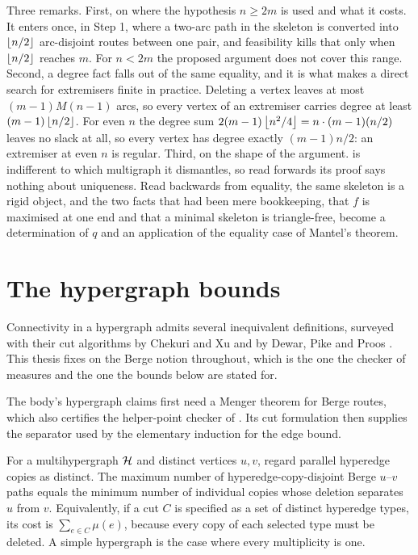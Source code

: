 Three remarks. First, on where the hypothesis $n \ge 2m$ is used and what it costs. It enters once, in Step 1, where a two-arc path in the skeleton is converted into $\left\lfloor n/2 \right\rfloor$ arc-disjoint routes between one pair, and feasibility kills that only when $\left\lfloor n/2 \right\rfloor$ reaches $m$. For $n < 2m$ the proposed argument does not cover this range. Second, a degree fact falls out of the same equality, and it is what makes a direct search for extremisers finite in practice. Deleting a vertex leaves at most $(m-1)M(n-1)$ arcs, so every vertex of an extremiser carries degree at least $(m-1)\left\lfloor n/2 \right\rfloor$. For even $n$ the degree sum $2(m-1)\left\lfloor n^2/4 \right\rfloor = n \cdot (m-1)(n/2)$ leaves no slack at all, so every vertex has degree exactly $(m-1)n/2$: an extremiser at even $n$ is regular. Third, on the shape of the argument.  is indifferent to which multigraph it dismantles, so read forwards its proof says nothing about uniqueness. Read backwards from equality, the same skeleton is a rigid object, and the two facts that had been mere bookkeeping, that $f$ is maximised at one end and that a minimal skeleton is triangle-free, become a determination of $q$ and an application of the equality case of Mantel's theorem.



\section{The hypergraph bounds}

Connectivity in a hypergraph admits several inequivalent definitions, surveyed with their cut algorithms by Chekuri and Xu \cite{ChekuriXu17} and by Dewar, Pike and Proos \cite{DewarPikeProos18}. This thesis fixes on the Berge notion throughout, which is the one the checker of  measures and the one the bounds below are stated for.

The body's hypergraph claims first need a Menger theorem for Berge routes, which also certifies the helper-point checker of . Its cut formulation then supplies the separator used by the elementary induction for the edge bound.

\begin{theorem}\label{thm:menger-hyper}
For a multihypergraph $\mathcal{H}$ and distinct vertices $u, v$, regard parallel hyperedge copies as distinct. The maximum number of hyperedge-copy-disjoint Berge $u$--$v$ paths equals the minimum number of individual copies whose deletion separates $u$ from $v$. Equivalently, if a cut $C$ is specified as a set of distinct hyperedge types, its cost is $\sum_{e\in C}\mu(e)$, because every copy of each selected type must be deleted. A simple hypergraph is the case where every multiplicity is one.
\end{theorem}

